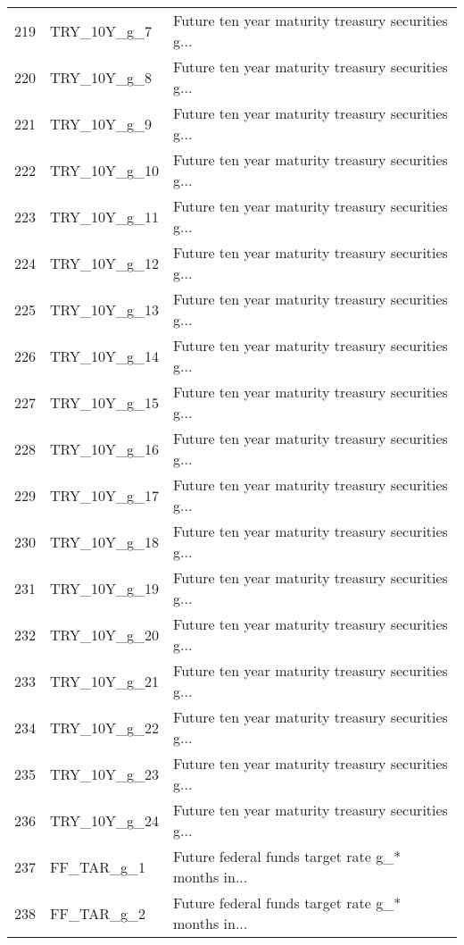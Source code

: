 \begin{tabular}{lll}
219 &                TRY\_10Y\_g\_7 &  Future ten year maturity treasury securities g... \\
220 &                TRY\_10Y\_g\_8 &  Future ten year maturity treasury securities g... \\
221 &                TRY\_10Y\_g\_9 &  Future ten year maturity treasury securities g... \\
222 &               TRY\_10Y\_g\_10 &  Future ten year maturity treasury securities g... \\
223 &               TRY\_10Y\_g\_11 &  Future ten year maturity treasury securities g... \\
224 &               TRY\_10Y\_g\_12 &  Future ten year maturity treasury securities g... \\
225 &               TRY\_10Y\_g\_13 &  Future ten year maturity treasury securities g... \\
226 &               TRY\_10Y\_g\_14 &  Future ten year maturity treasury securities g... \\
227 &               TRY\_10Y\_g\_15 &  Future ten year maturity treasury securities g... \\
228 &               TRY\_10Y\_g\_16 &  Future ten year maturity treasury securities g... \\
229 &               TRY\_10Y\_g\_17 &  Future ten year maturity treasury securities g... \\
230 &               TRY\_10Y\_g\_18 &  Future ten year maturity treasury securities g... \\
231 &               TRY\_10Y\_g\_19 &  Future ten year maturity treasury securities g... \\
232 &               TRY\_10Y\_g\_20 &  Future ten year maturity treasury securities g... \\
233 &               TRY\_10Y\_g\_21 &  Future ten year maturity treasury securities g... \\
234 &               TRY\_10Y\_g\_22 &  Future ten year maturity treasury securities g... \\
235 &               TRY\_10Y\_g\_23 &  Future ten year maturity treasury securities g... \\
236 &               TRY\_10Y\_g\_24 &  Future ten year maturity treasury securities g... \\
237 &                 FF\_TAR\_g\_1 &  Future federal funds target rate g\_* months in... \\
238 &                 FF\_TAR\_g\_2 &  Future federal funds target rate g\_* months in... \\

\end{tabular}
